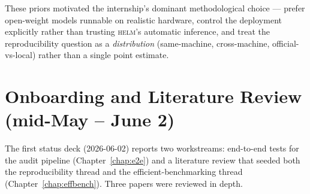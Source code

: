 \documentclass[11pt]{report}
\begin{document}
These priors motivated the internship's dominant methodological choice --- prefer
open-weight models runnable on realistic hardware, control the deployment
explicitly rather than trusting \textsc{helm}'s automatic inference, and treat the
reproducibility question as a \emph{distribution} (same-machine, cross-machine,
official-vs-local) rather than a single point estimate.

\chapter{Onboarding and Literature Review (mid-May -- June 2)}
\label{chap:litreview}

The first status deck (2026-06-02) reports two workstreams: end-to-end tests for
the audit pipeline (Chapter~\ref{chap:e2e}) and a literature review that seeded
both the reproducibility thread and the efficient-benchmarking thread
(Chapter~\ref{chap:effbench}). Three papers were reviewed in depth.
\end{document}
